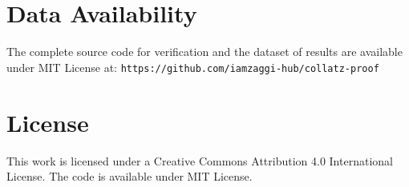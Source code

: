 \documentclass[11pt]{amsart}
\begin{document}
\section*{Data Availability}
The complete source code for verification and the dataset of results are available under MIT License at: \texttt{https://github.com/iamzaggi-hub/collatz-proof}

\section*{License}
This work is licensed under a Creative Commons Attribution 4.0 International License. The code is available under MIT License.
\end{document}
